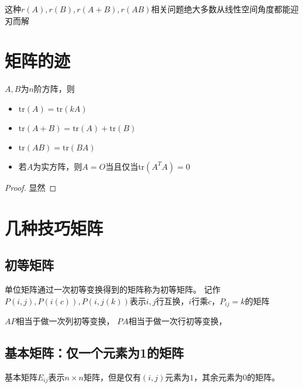 \begin{note}
  这种$r(A),r(B),r(A+B),r(AB)$相关问题绝大多数从线性空间角度都能迎刃而解
\end{note}

\section{矩阵的迹}

\begin{theorem}[矩阵迹的性质]
  $A,B$为$n$阶方阵，则
  \begin{itemize}
  \item $\mathrm{tr}(A) = \mathrm{tr}(kA)$
  \item $\mathrm{tr}(A + B) = \mathrm{tr}(A) + \mathrm{tr}(B)$
  \item $\mathrm{tr}(AB) = \mathrm{tr}(BA)$
  \item 若$A$为实方阵，则$A = O$当且仅当$\mathrm{tr}(A^TA) = 0$
  \end{itemize}
\end{theorem}

\begin{proof}
  显然
\end{proof}


\section{几种技巧矩阵}

\subsection{初等矩阵}

\begin{definition}[初等矩阵]
  单位矩阵通过一次初等变换得到的矩阵称为初等矩阵。
  记作$P(i,j),P(i(c)),P(i,j(k))$表示$i,j$行互换，$i$行乘$c$，$P_{ij} = k$的矩阵
\end{definition}

\begin{theorem}[初等矩阵乘法]
  $AP$相当于做一次列初等变换，
  $PA$相当于做一次行初等变换，
\end{theorem}





\subsection{基本矩阵：仅一个元素为1的矩阵}

\begin{definition}[基本矩阵]
  基本矩阵$E_{ij}$表示$n\times n$矩阵，但是仅有$(i,j)$元素为$1$，其余元素为$0$的矩阵。
\end{definition}

